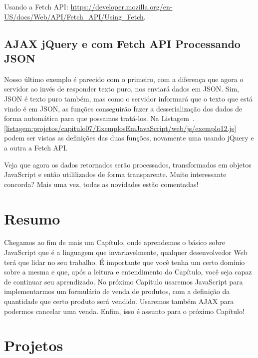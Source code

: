 \begin{saibaMais}
    Usando a Fetch API: \url{https://developer.mozilla.org/en-US/docs/Web/API/Fetch_API/Using_Fetch}.
\end{saibaMais}


\subsection{AJAX jQuery e com Fetch API Processando JSON}

Nosso último exemplo é parecido com o primeiro, com a diferença que agora o servidor ao invés de responder texto puro, nos enviará dados em JSON. Sim, JSON é texto puro também, mas como o servidor informará que o texto que está vindo é em JSON, as funções conseguirão fazer a desserialização dos dados de forma automática para que possamos tratá-los. Na Listagem~\thechapter.\ref{listagem:projetos/capitulo07/ExemplosEmJavaScript/web/js/exemplo12.js} podem ser vistas as definições das duas funções, novamente uma usando jQuery e a outra a Fetch API.


Veja que agora os dados retornados serão processados, transformados em objetos JavaScript e então utililizados de forma transparente. Muito interessante concorda? Mais uma vez, todas as novidades estão comentadas!



\section{Resumo}

Chegamos ao fim de mais um Capítulo, onde aprendemos o básico sobre JavaScript que é a linguagem que invariavelmente, qualquer desenvolvedor Web terá que lidar no seu trabalho. É importante que você tenha um certo domínio sobre a mesma e que, após a leitura e entendimento do Capítulo, você seja capaz de continuar seu aprendizado. No próximo Capítulo usaremos JavaScript para implementarmos um formulário de venda de produtos, com a definição da quantidade que certo produto será vendido. Usaremos também AJAX para podermos cancelar uma venda. Enfim, isso é assunto para o próximo Capítulo!



\section{Projetos}

